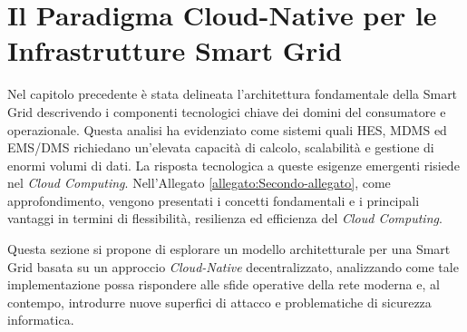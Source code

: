 \newpage
\chapter{Il Paradigma Cloud-Native per le Infrastrutture Smart Grid}


Nel capitolo precedente è stata delineata l'architettura fondamentale della Smart Grid descrivendo i componenti tecnologici chiave dei domini del consumatore e operazionale. Questa analisi ha evidenziato come sistemi quali HES, MDMS ed EMS/DMS richiedano un'elevata capacità di calcolo, scalabilità e gestione di enormi volumi di dati. La risposta tecnologica a queste esigenze emergenti risiede nel \textit{Cloud Computing}. Nell'Allegato \ref{allegato:Secondo-allegato}, come approfondimento, vengono presentati i concetti fondamentali e i principali vantaggi in termini di flessibilità, resilienza ed efficienza del \textit{Cloud Computing}.


Questa sezione si propone di esplorare un modello architetturale per una Smart Grid basata su un approccio \textit{Cloud-Native} decentralizzato, analizzando come tale implementazione possa rispondere alle sfide operative della rete moderna e, al contempo, introdurre nuove superfici di attacco e problematiche di sicurezza informatica.






